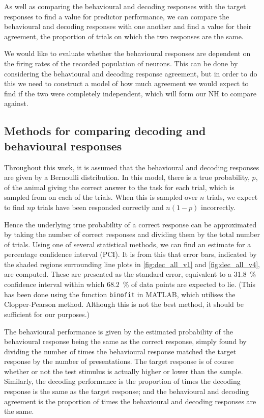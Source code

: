 As well as comparing the behavioural and decoding responses with the target responses to find a value for predictor performance, we can compare the behavioural and decoding responses with one another and find a value for their agreement, the proportion of trials on which the two responses are the same.

We would like to evaluate whether the behavioural responses are dependent on the firing rates of the recorded population of neurons.
This can be done by considering the behavioural and decoding response agreement, but in order to do this we need to construct a model of how much agreement we would expect to find if the two were completely independent, which will form our \ac{NH} to compare against.


\subsection{Methods for comparing decoding and behavioural responses}
\label{sec:dec-meth-prob}

Throughout this work, it is assumed that the behavioural and decoding responses are given by a Bernoulli distribution.
In this model, there is a true probability, $p$, of the animal giving the correct answer to the task for each trial, which is sampled from on each of the trials.
When this is sampled over $n$ trials, we expect to find $np$ trials have been responded correctly and $n(1-p)$ incorrectly.

Hence the underlying true probability of a correct response can be approximated by taking the number of correct responses and dividing them by the total number of trials.
Using one of several statistical methods, we can find an estimate for a percentage confidence interval (PCI).
It is from this that error bars, indicated by the shaded regions surrounding line plots in \autoref{fig:dec_all_v1} and \autoref{fig:dec_all_v4}, are computed.
These are presented as the standard error, equivalent to a \SI{31.8}{\percent}  confidence interval within which \SI{68.2}{\percent} of data points are expected to lie.
(This has been done using the function \texttt{binofit} in MATLAB, which utilises the Clopper-Pearson method.
Although this is not the best method, it should be sufficient for our purposes.)

The behavioural performance is given by the estimated probability of the behavioural response being the same as the correct response, simply found by dividing the number of times the behavioural response matched the target response by the number of presentations.
The target response is of course whether or not the test stimulus is actually higher or lower than the sample.
Similarly, the decoding performance is the proportion of times the decoding response is the same as the target response; and the behavioural and decoding agreement is the proportion of times the behavioural and decoding responses are the same.


